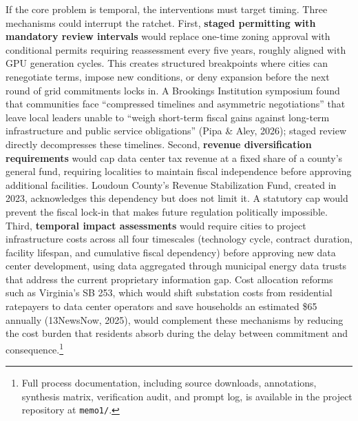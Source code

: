 \documentclass[10pt, twocolumn]{article}
\begin{document}
If the core problem is temporal, the interventions must target timing. Three mechanisms could interrupt the ratchet. First, \textbf{staged permitting with mandatory review intervals} would replace one-time zoning approval with conditional permits requiring reassessment every five years, roughly aligned with GPU generation cycles. This creates structured breakpoints where cities can renegotiate terms, impose new conditions, or deny expansion before the next round of grid commitments locks in. A Brookings Institution symposium found that communities face ``compressed timelines and asymmetric negotiations'' that leave local leaders unable to ``weigh short-term fiscal gains against long-term infrastructure and public service obligations'' (Pipa \& Aley, 2026); staged review directly decompresses these timelines. Second, \textbf{revenue diversification requirements} would cap data center tax revenue at a fixed share of a county's general fund, requiring localities to maintain fiscal independence before approving additional facilities. Loudoun County's Revenue Stabilization Fund, created in 2023, acknowledges this dependency but does not limit it. A statutory cap would prevent the fiscal lock-in that makes future regulation politically impossible. Third, \textbf{temporal impact assessments} would require cities to project infrastructure costs across all four timescales (technology cycle, contract duration, facility lifespan, and cumulative fiscal dependency) before approving new data center development, using data aggregated through municipal energy data trusts that address the current proprietary information gap. Cost allocation reforms such as Virginia's SB 253, which would shift substation costs from residential ratepayers to data center operators and save households an estimated \$65 annually (13NewsNow, 2025), would complement these mechanisms by reducing the cost burden that residents absorb during the delay between commitment and consequence.\footnote{Full process documentation, including source downloads, annotations, synthesis matrix, verification audit, and prompt log, is available in the project repository at \texttt{memo1/}.}
\end{document}
